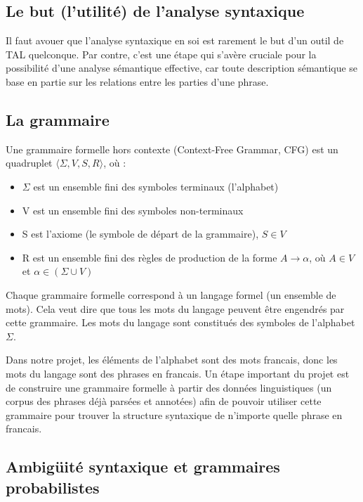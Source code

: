 \documentclass[12pt]{article}
\begin{document}
\subsection{Le but (l'utilit\'e) de l'analyse syntaxique}

Il faut avouer que l'analyse syntaxique en soi est rarement le but d'un outil de
TAL quelconque. Par contre, c'est une \'etape qui s'av\`ere cruciale pour la
possibilit\'e d'une analyse s\'emantique effective, car toute description
s\'emantique se base en partie sur les relations entre les parties d'une
phrase. 

\subsection{La grammaire}

Une grammaire formelle hors contexte (Context-Free Grammar, CFG) est un
quadruplet $\langle \Sigma, V, S, R \rangle$, o\`u :
\begin{itemize}
\item $\Sigma$ est un ensemble fini des symboles terminaux (l'alphabet)
\item V est un ensemble fini des symboles non-terminaux
\item S est l'axiome (le symbole de d\'epart de la grammaire), $S \in V$
\item R est un ensemble fini des r\`egles de production de la forme $A
\rightarrow \alpha$, o\`u $A \in V$ et $\alpha \in (\Sigma \cup V)$
\end{itemize}

Chaque grammaire formelle correspond \`a un langage formel (un ensemble de mots).
Cela veut dire que tous les mots du langage peuvent \^etre engendr\'es par cette
grammaire. Les mots du langage sont constitu\'es des symboles de l'alphabet
$\Sigma$.\par

Dans notre projet, les \'el\'ements de l'alphabet sont des mots francais, donc les
mots du langage sont des phrases en francais. Un \'etape important du projet est de construire
une grammaire formelle \`a partir des donn\'ees linguistiques (un corpus des phrases
d\'ej\`a pars\'ees et annot\'ees) afin de pouvoir utiliser cette grammaire pour trouver
la structure syntaxique de n'importe quelle phrase en francais.

\subsection{Ambig\"uit\'e syntaxique et grammaires probabilistes}
\end{document}
